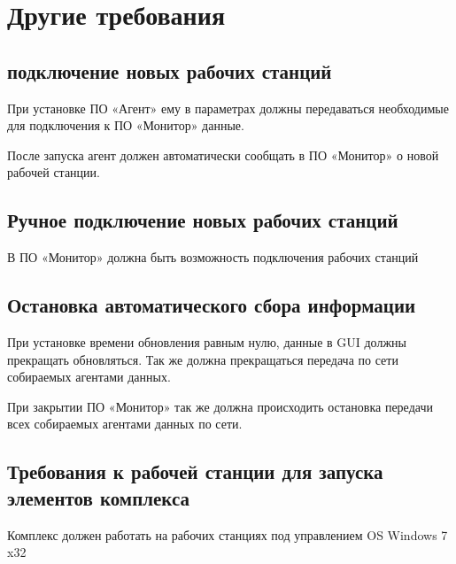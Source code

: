 \section{Другие требования }

\subsection{подключение новых рабочих станций}
При установке ПО «Агент» ему в параметрах должны передаваться необходимые для подключения к ПО «Монитор» данные.

После запуска агент должен автоматически сообщать в ПО «Монитор» о новой рабочей станции.

\subsection{Ручное подключение новых рабочих станций}
В ПО «Монитор» должна быть возможность подключения рабочих станций

\subsection{Остановка автоматического сбора информации}
При установке времени обновления равным нулю, данные в GUI должны прекращать обновляться. Так же должна прекращаться передача по сети собираемых агентами данных.

При закрытии ПО «Монитор» так же должна происходить остановка передачи всех собираемых агентами данных по сети.

\subsection{Требования к рабочей станции для запуска элементов комплекса}
Комплекс должен работать на рабочих станциях под управлением OS Windows 7 x32
